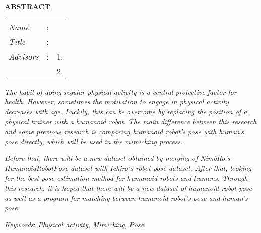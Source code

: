 \begin{center}
  \large\textbf{ABSTRACT}
\end{center}


\vspace{2ex}

\begingroup
\setlength{\tabcolsep}{0pt}

\noindent
\begin{tabularx}{\textwidth}{l >{\centering}m{3em} X}
  \emph{Name}     & : & \name{}         \\

  \emph{Title}    & : & \engtatitle{}   \\

  \emph{Advisors} & : & 1. \advisor{}   \\
                  &   & 2. \coadvisor{} \\
\end{tabularx}
\endgroup

\emph{The habit of doing regular physical activity is a central protective factor for health.
However, sometimes the motivation to engage in physical activity decreases with age.
Luckily, this can be overcome by replacing the position of a physical trainer with a humanoid robot.
The main difference between this research and some previous research is comparing humanoid robot's pose with human's pose directly, 
which will be used in the mimicking process.}

\emph{Before that, there will be a new dataset obtained by merging of NimbRo's HumanoidRobotPose dataset with Ichiro's robot pose dataset.
After that, looking for the best pose estimation method for humanoid robots and humans.
Through this research, it is hoped that there will be a new dataset of humanoid robot pose as well as a program for matching between humanoid robot's pose and human's pose.}

\emph{Keywords}: \emph{Physical activity}, \emph{Mimicking}, \emph{Pose}.

